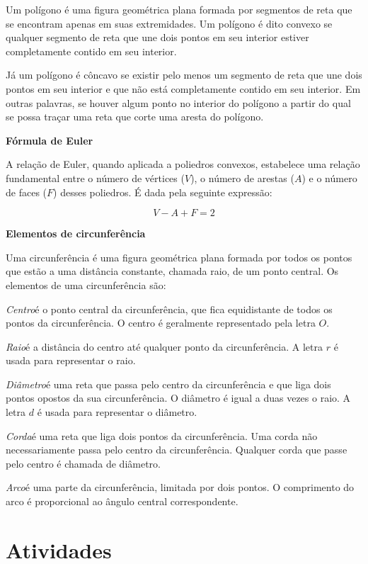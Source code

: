 {Um polígono é uma figura geométrica plana formada por segmentos de reta
que se encontram apenas em suas extremidades. Um polígono é dito convexo
se qualquer segmento de reta que une dois pontos em seu interior estiver
completamente contido em seu interior.

Já um polígono é côncavo se existir pelo menos um segmento de reta que
une dois pontos em seu interior e que não está completamente contido em
seu interior. Em outras palavras, se houver algum ponto no interior do
polígono a partir do qual se possa traçar uma reta que corte uma aresta
do polígono.

\textbf{Fórmula de Euler}

\noindent A relação de Euler, quando aplicada a poliedros convexos, estabelece uma
relação fundamental entre o número de vértices ($V$), o número de arestas ($A$) e o
número de faces ($F$) desses poliedros. É dada pela seguinte expressão:

$$V - A + F = 2$$

\textbf{Elementos de circunferência}

\noindent Uma circunferência é uma figura geométrica plana formada por todos os
pontos que estão a uma distância constante, chamada raio, de um ponto
central. Os elementos de uma circunferência são:

\noindent\textit{Centro}\quad é o ponto central da circunferência, que fica equidistante de
todos os pontos da circunferência. O centro é geralmente representado
pela letra $O$.

\noindent\textit{Raio}\quad é a distância do centro até qualquer ponto da
circunferência. A letra $r$ é usada para representar o raio.

\noindent\textit{Diâmetro}\quad é uma reta que passa pelo centro da circunferência e que liga
dois pontos opostos da sua circunferência. O diâmetro é igual a duas
vezes o raio. A letra $d$ é usada para representar o diâmetro.

\noindent\textit{Corda}\quad é uma reta que liga dois pontos da circunferência. Uma corda não
necessariamente passa pelo centro da circunferência. Qualquer corda que
passe pelo centro é chamada de diâmetro.

\noindent\textit{Arco}\quad é uma parte da circunferência, limitada por dois pontos. O
comprimento do arco é proporcional ao ângulo central correspondente.}

\section*{Atividades}


